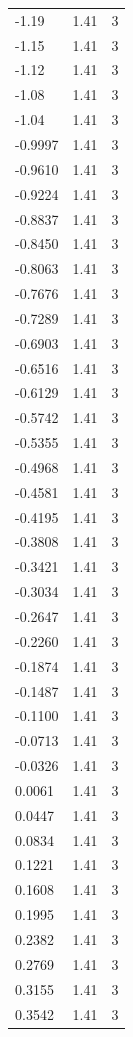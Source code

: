 \begin{longtable}{lrr}
  -1.19 & 1.41 & 3 \\
  -1.15 & 1.41 & 3 \\
  -1.12 & 1.41 & 3 \\
  -1.08 & 1.41 & 3 \\
  -1.04 & 1.41 & 3 \\
  -0.9997 & 1.41 & 3 \\
  -0.9610 & 1.41 & 3 \\
  -0.9224 & 1.41 & 3 \\
  -0.8837 & 1.41 & 3 \\
  -0.8450 & 1.41 & 3 \\
  -0.8063 & 1.41 & 3 \\
  -0.7676 & 1.41 & 3 \\
  -0.7289 & 1.41 & 3 \\
  -0.6903 & 1.41 & 3 \\
  -0.6516 & 1.41 & 3 \\
  -0.6129 & 1.41 & 3 \\
  -0.5742 & 1.41 & 3 \\
  -0.5355 & 1.41 & 3 \\
  -0.4968 & 1.41 & 3 \\
  -0.4581 & 1.41 & 3 \\
  -0.4195 & 1.41 & 3 \\
  -0.3808 & 1.41 & 3 \\
  -0.3421 & 1.41 & 3 \\
  -0.3034 & 1.41 & 3 \\
  -0.2647 & 1.41 & 3 \\
  -0.2260 & 1.41 & 3 \\
  -0.1874 & 1.41 & 3 \\
  -0.1487 & 1.41 & 3 \\
  -0.1100 & 1.41 & 3 \\
  -0.0713 & 1.41 & 3 \\
  -0.0326 & 1.41 & 3 \\
  0.0061 & 1.41 & 3 \\
  0.0447 & 1.41 & 3 \\
  0.0834 & 1.41 & 3 \\
  0.1221 & 1.41 & 3 \\
  0.1608 & 1.41 & 3 \\
  0.1995 & 1.41 & 3 \\
  0.2382 & 1.41 & 3 \\
  0.2769 & 1.41 & 3 \\
  0.3155 & 1.41 & 3 \\
  0.3542 & 1.41 & 3 \\

\end{longtable}
